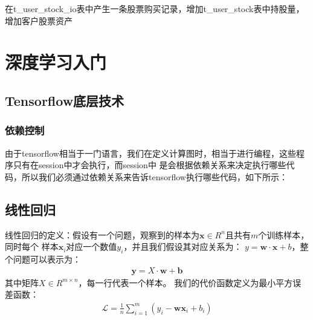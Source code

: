 \documentclass{article}
\begin{document}
在t\_user\_stock\_io表中产生一条股票购买记录，增加t\_user\_stock表中持股量，增加客户股票资产



















\section{深度学习入门}
\subsection{Tensorflow底层技术}
\subsubsection{依赖控制}
由于tensorflow相当于一门语言，我们在定义计算图时，相当于进行编程，这些程序只有在session中才会执行，而session中
是会根据依赖关系来决定执行哪些代码，所以我们必须通过依赖关系来告诉tensorflow执行哪些代码，如下所示：
\subsection{线性回归}
线性回归的定义：假设有一个问题，观察到的样本为$\boldsymbol{x} \in R^{n}$且共有$m$个训练样本，同时每个
样本$\boldsymbol{x}_{i}$对应一个数值$y_{i}$，并且我们假设其对应关系为：
$y=\boldsymbol{w} \cdot \boldsymbol{x}+b$，整个问题可以表示为：
\begin{equation}
    \begin{aligned}
        \boldsymbol{y} = X \cdot \boldsymbol{w} + \boldsymbol{b}
    \end{aligned}
    \label{e000001}
\end{equation}
其中矩阵$X \in R^{m \times n}$，每一行代表一个样本。\newline
我们的代价函数定义为最小平方误差函数：
\begin{equation}
    \begin{aligned}
        \mathcal{L}=\frac{1}{n}\sum_{i=1}^{m}(y_{i} - \boldsymbol{w} \boldsymbol{x}_{i} + b_{i})
    \end{aligned}
    \label{e000002}
\end{equation}
\end{document}
